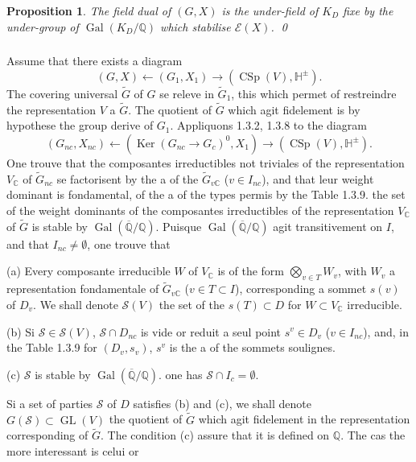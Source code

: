 \documentclass[12pt,a4paper]{article}
\theoremstyle{plain}
\newtheorem{proposition}[theorem]{Proposition}
\theoremstyle{definition}
\theoremstyle{remark}
\DeclareMathOperator{\GL}{GL}
\DeclareMathOperator{\CSp}{CSp}
\DeclareMathOperator{\Gal}{Gal}
\DeclareMathOperator{\Ker}{Ker}
\newcommand{\QQ}{\mathbb{Q}}
\newcommand{\CC}{\mathbb{C}}
\newcommand{\HH}{\mathbb{H}}
\begin{document}
\begin{proposition}
The field dual of $(G,X)$ is the under-field of $K_D$ fixe by the under-group of $\Gal(K_D/\QQ)$ which stabilise $\mathcal{E}(X)$.
\qed
\end{proposition}

\subsubsection{}

Assume that there exists a diagram
\begin{equation}\label{eq:2.3.7.1}
(G,X) \longleftarrow (G_1,X_1) \longrightarrow (\CSp(V),\HH^{\pm}).
\end{equation}
The covering universal $\tilde{G}$ of $G$ se releve in $\tilde{G}_1$, this which permet of restreindre the representation $V$ a $\tilde{G}$. The quotient of $\tilde{G}$ which agit fidelement is by hypothese the group derive of $G_1$. Appliquons 1.3.2, 1.3.8 to the diagram
\[
(G_{nc}, X_{nc}) \longleftarrow (\Ker(G_{nc} \to G_c)^0, X_1) \longrightarrow (\CSp(V),\HH^{\pm}).
\]
One trouve that the composantes irreductibles not triviales of the representation $V_{\CC}$ of $\tilde{G}_{nc}$ se factorisent by the a of the $\tilde{G}_{v\CC}$ ($v \in I_{nc}$), and that leur weight dominant is fondamental, of the a of the types permis by the Table 1.3.9. the set of the weight dominants of the composantes irreductibles of the representation $V_{\CC}$ of $\tilde{G}$ is stable by $\Gal(\overline{\QQ}/\QQ)$. Puisque $\Gal(\overline{\QQ}/\QQ)$ agit transitivement on $I$, and that $I_{nc} \neq \emptyset$, one trouve that

(a) Every composante irreducible $W$ of $V_{\CC}$ is of the form $\bigotimes_{v \in T} W_v$, with $W_v$ a representation fondamentale of $\tilde{G}_{v\CC}$ ($v \in T \subset I$), corresponding a sommet $s(v)$ of $D_v$. We shall denote $\mathcal{S}(V)$ the set of the $s(T) \subset D$ for $W \subset V_{\CC}$ irreducible.

(b) Si $\mathcal{S} \in \mathcal{S}(V)$, $\mathcal{S} \cap D_{nc}$ is vide or reduit a seul point $s^v \in D_v$ ($v \in I_{nc}$), and, in the Table 1.3.9 for $(D_v, s_v)$, $s^v$ is the a of the sommets soulignes.

(c) $\mathcal{S}$ is stable by $\Gal(\overline{\QQ}/\QQ)$. one has $\mathcal{S} \cap I_c = \emptyset$.

Si a set of parties $\mathcal{S}$ of $D$ satisfies (b) and (c), we shall denote $G(\mathcal{S}) \subset \GL(V)$ the quotient of $\tilde{G}$ which agit fidelement in the representation corresponding of $\tilde{G}$. The condition (c) assure that it is defined on $\QQ$. The cas the more interessant is celui or
\end{document}
